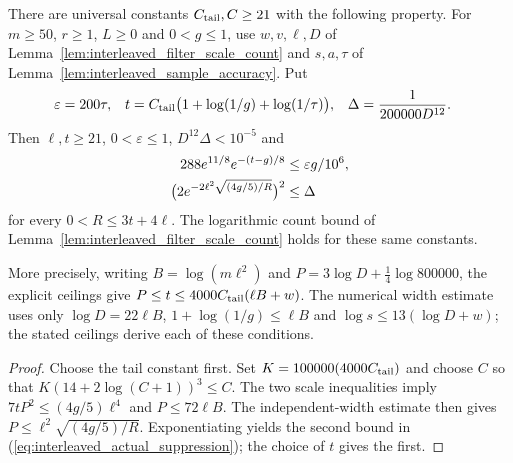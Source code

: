 \begin{lemma}
    \label{lem:interleaved_actual_suppression}
    \leanok
    There are universal constants $C_{\rm tail},C\ge21$ with the following
    property. For $m\ge50$, $r\ge1$, $L\ge0$ and $0<g\le1$, use
    $w,v,\ell,D$ of Lemma~\ref{lem:interleaved_filter_scale_count} and
    $s,a,\tau$ of Lemma~\ref{lem:interleaved_sample_accuracy}. Put
    \begin{align}
        \varepsilon & =200\tau,                                          &
        t           & =C_{\rm tail}\bigl(1+\log(1/g)+\log(1/\tau)\bigr), &
        \Delta      & =\frac{1}{200000D^{12}}.
        \label{eq:interleaved_actual_cutoff}
    \end{align}
    Then $\ell,t\ge21$, $0<\varepsilon\le1$, $D^{12}\Delta<10^{-5}$ and
    \begin{align}
        288e^{11/8}e^{-(t-g)/8}                    & \le\varepsilon g/10^6,\notag \\
        \bigl(2e^{-2\ell^2\sqrt{(4g/5)/R}}\bigr)^2 & \le\Delta
        \label{eq:interleaved_actual_suppression}
    \end{align}
    for every $0<R\le3t+4\ell$. The logarithmic count bound of
    Lemma~\ref{lem:interleaved_filter_scale_count} holds for these same constants.

    More precisely, writing $B=\log(m\ell^2)$ and
    $P=3\log D+\frac14\log800000$, the explicit ceilings give
    $P\le t\le4000C_{\rm tail}(\ell B+w)$.
    The numerical width estimate uses only $\log D=22\ell B$,
    $1+\log(1/g)\le\ell B$ and $\log s\le13(\log D+w)$;
    the stated ceilings derive each of these conditions.
\end{lemma}
\begin{proof}\leanok
    Choose the tail constant first. Set $K=100000(4000C_{\rm tail})$
    and choose $C$ so that $K(14+2\log(C+1))^3\le C$.
    The two scale inequalities imply
    $7tP^2\le(4g/5)\ell^4$ and $P\le72\ell B$.
    The independent-width estimate then gives
    $P\le\ell^2\sqrt{(4g/5)/R}$.
    Exponentiating yields the second bound in
    (\ref{eq:interleaved_actual_suppression}); the choice of $t$ gives the first.
\end{proof}

